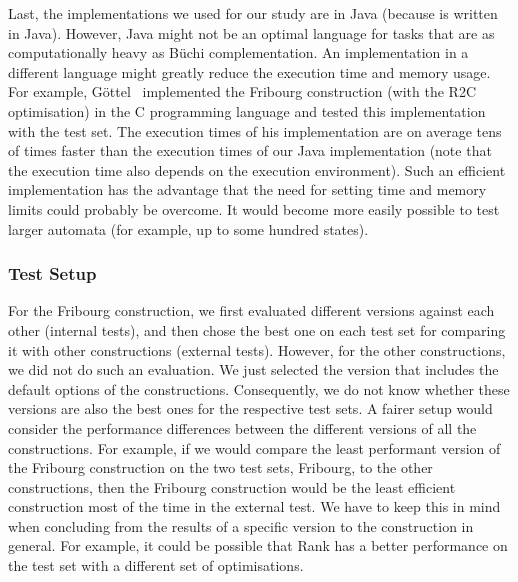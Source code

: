 Last, the implementations we used for our study are in Java (because \goal{} is written in Java). However, Java might not be an optimal language for tasks that are as computationally heavy as Büchi complementation. An implementation in a different language might greatly reduce the execution time and memory usage. For example, Göttel~\cite{2013_bsc_goettel} implemented the Fribourg construction (with the R2C optimisation) in the C programming language and tested this implementation with the \goal{} test set. The execution times of his implementation are on average tens of times faster than the execution times of our Java implementation (note that the execution time also depends on the execution environment). Such an efficient implementation has the advantage that the need for setting time and memory limits could probably be overcome. It would become more easily possible to test larger automata (for example, up to some hundred states).

\subsubsection{Test Setup}
For the Fribourg construction, we first evaluated different versions against each other (internal tests), and then chose the best one on each test set for comparing it with other constructions (external tests). However, for the other constructions, we did not do such an evaluation. We just selected the version that includes the default options of the constructions. Consequently, we do not know whether these versions are also the best ones for the respective test sets. A fairer setup would consider the performance differences between the different versions of all the constructions. For example, if we would compare the least performant version of the Fribourg construction on the two test sets, Fribourg, to the other constructions, then the Fribourg construction would be the least efficient construction most of the time in the external test. We have to keep this in mind when concluding from the results of a specific version to the construction in general. For example, it could be possible that Rank has a better performance on the \goal{} test set with a different set of optimisations.

